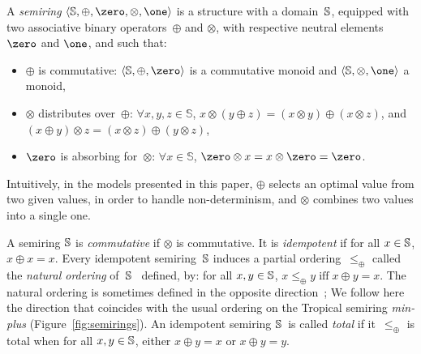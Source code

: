 %
A \emph{semiring} $\< \Semiring, \oplus, \zero, \otimes, \one>$
is a structure with a domain~$\mathbb{S}$,
equipped with two associative
binary operators~$\oplus$ and $\otimes$,
with respective neutral elements $\zero$ and $\one$, and such that:
\begin{itemize}
\item $\oplus$ is commutative:
 $\< \Semiring, \oplus, \zero>$ is a commutative monoid
   and $\< \Semiring, \otimes, \one>$ a monoid,
\item $\otimes$ distributes over~$\oplus$:  $\forall x, y, z \in \mathbb{S}$,
$x \otimes (y \oplus z) = (x \otimes y) \oplus (x \otimes z)$,
and $(x \oplus y) \otimes z = (x \otimes z) \oplus (y \otimes z)$,
\item $\zero$ is absorbing for~$\otimes$:
$\forall x\in \mathbb{S}$, $\zero \otimes x = x \otimes \zero = \zero$.
\end{itemize}
%
Intuitively, in the models presented in this paper,
$\oplus$ selects an optimal value from two given values,
in order to handle non-determinism,
and $\otimes$ combines two values into a single one.

A semiring $\mathbb{S}$ is \emph{commutative} if $\otimes$ is commutative.
It is \emph{idempotent} if for all $x \in \mathbb{S}$, $x \oplus x = x$.
%
Every idempotent semiring~$\mathbb{S}$ induces
a partial ordering~$\leq_\oplus$
called the \emph{natural ordering} of~$\mathbb{S}$~\cite{Mohri02semiring}
defined,  by:
for all $x, y\in \mathbb{S}$,
$x \leq_\oplus y \;\mbox{iff}\; x \oplus y = x$.
%
The natural ordering is sometimes defined in the opposite direction~\cite{DrosteKuich09semirings};
We follow here the direction  %
that coincides with the usual ordering on the Tropical semiring \emph{min-plus}
(Figure~\ref{fig:semirings}).
%
\noindent
An idempotent semiring $\mathbb{S}$~is called \emph{total} if
it~$\leq_\oplus$ is total
\ie when for all $x, y \in \mathbb{S}$, either $x \oplus y = x$ or $x \oplus y = y$.

